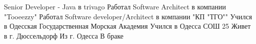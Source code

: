  
 
 
 
 

\par
Senior Developer - Java в trivago
Работал Software Architect в компании "Tooeezzy"
Работал Software developer/Architect в компании "КП "ТГО""
Учился в Одесская Государственная Морская Академия
Учился в Одесса СОШ 25
Живет в г. Дюссельдорф
Из г. Одесса
В браке

